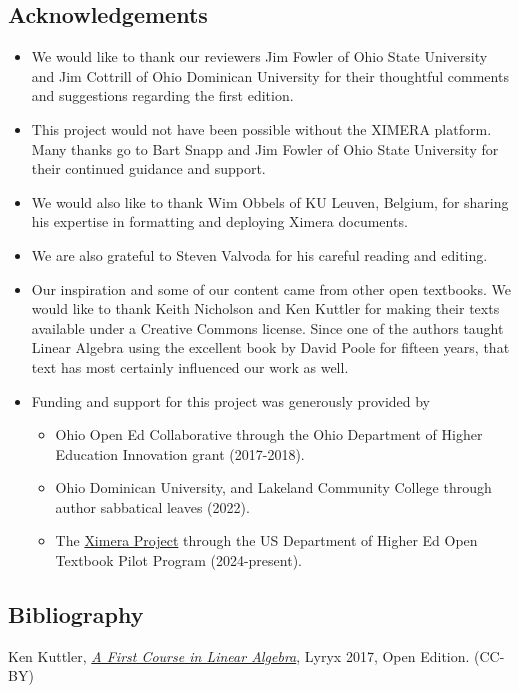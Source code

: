 \documentclass{ximera}
\begin{document}
\subsection*{Acknowledgements}
\begin{itemize}
\item
We would like to thank our reviewers Jim Fowler of Ohio State University and Jim Cottrill of Ohio Dominican University for their thoughtful comments and suggestions regarding the first edition.  
\item This project would not have been possible without the XIMERA platform.  Many thanks go to Bart Snapp and Jim Fowler of Ohio State University for their continued guidance and support.   
\item We would also like to thank Wim Obbels of KU Leuven, Belgium, for sharing his expertise in formatting and deploying Ximera documents.
\item We are also grateful to Steven Valvoda for his careful reading and editing.
\item Our inspiration and some of our content came from other open textbooks. We would like to thank Keith Nicholson and Ken Kuttler for making their texts available under a Creative Commons license.  Since one of the authors taught Linear Algebra using the excellent book by David Poole for fifteen years, that text has most certainly influenced our work as well.
\item Funding and support for this project was generously provided by
    \begin{itemize}
        \item Ohio Open Ed Collaborative through the Ohio Department of Higher Education Innovation grant (2017-2018).
        \item Ohio Dominican University, and Lakeland Community College through author sabbatical leaves (2022).
        \item The \href{https://github.com/XimeraProject}{Ximera Project} through the US Department of Higher Ed Open Textbook Pilot Program (2024-present).
    \end{itemize}
\end{itemize}

\subsection*{Bibliography}

Ken Kuttler, \href{https://open.umn.edu/opentextbooks/textbooks/a-first-course-in-linear-algebra-2017}{\it A First Course in Linear Algebra}, Lyryx 2017, Open Edition. (CC-BY)
\end{document}

